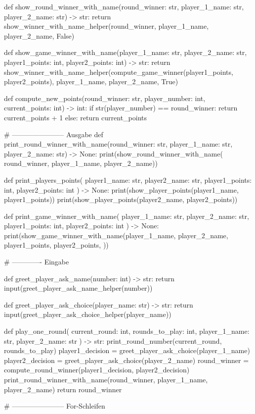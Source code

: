 \documentclass[a4paper, DIV = calc]{scrartcl}
\newcommand{\expandpyconc}[1]{\expandafter\reallyexpandpyconc\expandafter{#1}}
\newcommand{\reallyexpandpyconc}[1]{\pyconc{exec(compile(open('#1', 'rb').read(), '#1', 'exec'))}}
\newenvironment{pyconcodeblck}[1]
{\newcommand{\snippetfile}{snippet-#1.py}
	\VerbatimEnvironment
	\begin{VerbatimOut}{\snippetfile}}
	{\end{VerbatimOut}
	\expandpyconc{\snippetfile}}
\begin{document}
\begin{pyconcodeblck}{rps}
def show_round_winner_with_name(round_winner: str, player_1_name: str, player_2_name: str) -> str:
    return show_winner_with_name_helper(round_winner, player_1_name, player_2_name, False)

def show_game_winner_with_name(player_1_name: str, player_2_name: str, player1_points: int, player2_points: int) -> str:
    return show_winner_with_name_helper(compute_game_winner(player1_points, player2_points), player_1_name, player_2_name, True)


def compute_new_points(round_winner: str, player_number: int, current_points: int) -> int:
    if str(player_number) == round_winner:
        return current_points + 1
    else:
        return current_points

# ----------------------- Ausgabe
def print_round_winner_with_name(round_winner: str, player_1_name: str, player_2_name: str) -> None:
    print(show_round_winner_with_name(
        round_winner, player_1_name, player_2_name))


def print_players_points(
    player1_name: str, player2_name: str, player1_points: int, player2_points: int
) -> None:
    print(show_player_points(player1_name, player1_points))
    print(show_player_points(player2_name, player2_points))


def print_game_winner_with_name(
    player_1_name: str, player_2_name: str, player1_points: int, player2_points: int
) -> None:
    print(show_game_winner_with_name(player_1_name, player_2_name,
            player1_points, player2_points, ))

# ------------- Eingabe


def greet_player_ask_name(number: int) -> str:
    return input(greet_player_ask_name_helper(number))


def greet_player_ask_choice(player_name: str) -> str:
    return input(greet_player_ask_choice_helper(player_name))


def play_one_round(
    current_round: int, rounds_to_play: int, player_1_name: str, player_2_name: str
) -> str:
    print_round_number(current_round, rounds_to_play)
    player1_decision = greet_player_ask_choice(player_1_name)
    player2_decision = greet_player_ask_choice(player_2_name)
    round_winner = compute_round_winner(player1_decision, player2_decision)
    print_round_winner_with_name(round_winner, player_1_name, player_2_name)
    return round_winner

# ----------------------- For-Schleifen



\end{pyconcodeblck}
\end{document}
